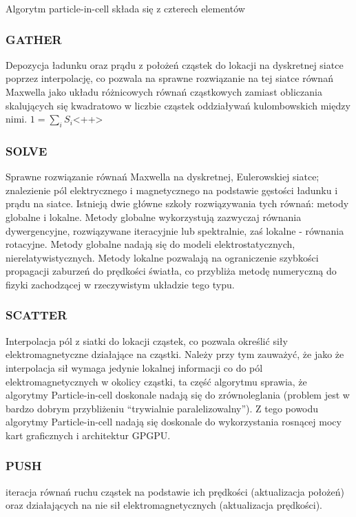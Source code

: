 Algorytm particle-in-cell składa się z czterech elementów %
\subsubsection{GATHER}
    Depozycja ładunku oraz prądu z położeń cząstek do lokacji na dyskretnej siatce poprzez interpolację,
    co pozwala na sprawne rozwiązanie na tej siatce
    równań Maxwella jako układu różnicowych równań cząstkowych zamiast obliczania skalujących się kwadratowo w liczbie cząstek
    oddziaływań kulombowskich między nimi.
    $1 = \sum_i S_i$<++> %
\subsubsection{SOLVE}
    Sprawne rozwiązanie równań Maxwella na dyskretnej, Eulerowskiej siatce;
    znalezienie pól elektrycznego i magnetycznego
    na podstawie gęstości ładunku i prądu na siatce.
    Istnieją dwie główne szkoły rozwiązywania tych równań: metody globalne i lokalne. Metody globalne wykorzystują
    zazwyczaj równania dywergencyjne, rozwiązywane iteracyjnie lub spektralnie,
    zaś lokalne - równania rotacyjne. Metody globalne nadają się do modeli elektrostatycznych, nierelatywistycznych.
    Metody lokalne pozwalają na ograniczenie szybkości propagacji zaburzeń do prędkości światła, co przybliża
    metodę numeryczną do fizyki zachodzącej w rzeczywistym układzie tego typu.
\subsubsection{SCATTER}
        Interpolacja pól z siatki do lokacji cząstek, co pozwala określić siły elektromagnetyczne działające na cząstki.
        Należy przy tym zauważyć, że jako że interpolacja sił wymaga jedynie lokalnej informacji co do pól
        elektromagnetycznych w okolicy cząstki, ta część algorytmu sprawia, że algorytmy Particle-in-cell doskonale
        nadają się do zrównoleglania (problem jest w bardzo dobrym przybliżeniu ``trywialnie paralelizowalny''). Z tego powodu algorytmy
        Particle-in-cell nadają się doskonale do wykorzystania rosnącej mocy kart graficznych i architektur GPGPU.
\subsubsection{PUSH}
    iteracja równań ruchu cząstek na podstawie ich prędkości (aktualizacja położeń)
    oraz działających na nie sił elektromagnetycznych (aktualizacja prędkości).

